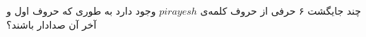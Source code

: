 \p
چند جایگشت ۶ حرفی از حروف کلمه‌ی $pirayesh$
وجود دارد به طوری که 
حروف اول و آخر آن صدادار باشند؟
